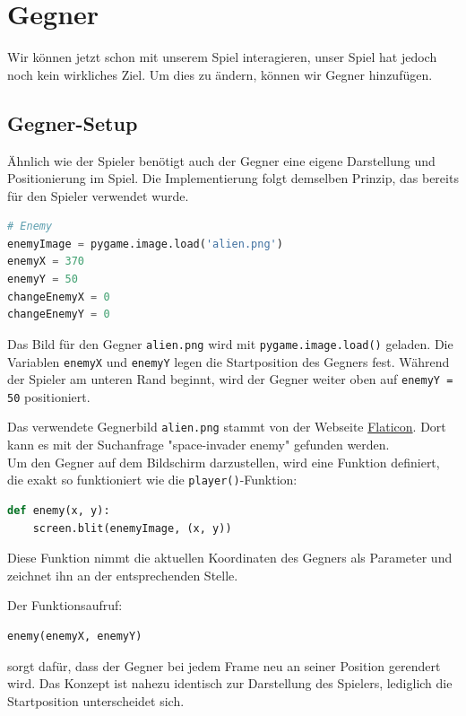 \documentclass{article}
\begin{document}
\newpage
\section{Gegner}
Wir können jetzt schon mit unserem Spiel interagieren, unser Spiel hat jedoch noch kein wirkliches Ziel. Um dies zu ändern, können wir Gegner hinzufügen.
\subsection{Gegner-Setup}
Ähnlich wie der Spieler benötigt auch der Gegner eine eigene Darstellung und Positionierung im Spiel. Die Implementierung folgt demselben Prinzip, das bereits für den Spieler verwendet wurde.

\begin{lstlisting}[style=pythonstyle, language=Python]
# Enemy
enemyImage = pygame.image.load('alien.png')
enemyX = 370
enemyY = 50
changeEnemyX = 0
changeEnemyY = 0
\end{lstlisting}

Das Bild für den Gegner \texttt{alien.png} wird mit \texttt{pygame.image.load()} geladen. Die Variablen \texttt{enemyX} und \texttt{enemyY} legen die Startposition des Gegners fest. Während der Spieler am unteren Rand beginnt, wird der Gegner weiter oben auf \texttt{enemyY = 50} positioniert.

Das verwendete Gegnerbild \texttt{alien.png} stammt von der Webseite \href{https://www.flaticon.com/}{Flaticon}. Dort kann es mit der Suchanfrage "space-invader enemy" gefunden werden.\\

Um den Gegner auf dem Bildschirm darzustellen, wird eine Funktion definiert, die exakt so funktioniert wie die \texttt{player()}-Funktion:

\begin{lstlisting}[style=pythonstyle, language=Python]
def enemy(x, y): 
    screen.blit(enemyImage, (x, y))
\end{lstlisting}

Diese Funktion nimmt die aktuellen Koordinaten des Gegners als Parameter und zeichnet ihn an der entsprechenden Stelle.

Der Funktionsaufruf:

\begin{lstlisting}[style=pythonstyle, language=Python]
enemy(enemyX, enemyY)
\end{lstlisting}

sorgt dafür, dass der Gegner bei jedem Frame neu an seiner Position gerendert wird. Das Konzept ist nahezu identisch zur Darstellung des Spielers, lediglich die Startposition unterscheidet sich.
\end{document}
